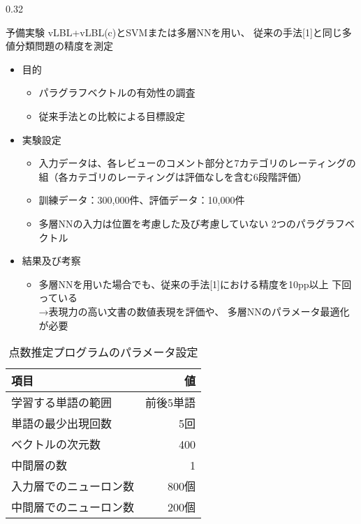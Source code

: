\documentclass[10pt,unicode]{beamer}
\newcommand{\columnsize}{0.32}
\newcommand{\tablefontsize}{\small}
\newcommand{\itemtitle}[1]{{\normalsize #1} \\}
\newcommand{\arrow}{{\color{ttiblue} →}\hspace{1ex}}
\begin{document}
\begin{frame}{}
\begin{columns}[t]
\begin{column}{\columnsize\textwidth} %
  \begin{block}{予備実験}
    vLBL+vLBL(c)とSVMまたは多層NNを用い、
    従来の手法[1]と同じ多値分類問題の精度を測定

    \begin{itemize}
      \item \itemtitle{目的}
      \begin{itemize}
        \item パラグラフベクトルの有効性の調査
        \item 従来手法との比較による目標設定
      \end{itemize}

      \item \itemtitle{実験設定}
      \begin{itemize}
        \item 入力データは、各レビューのコメント部分と7カテゴリのレーティングの
        組（各カテゴリのレーティングは評価なしを含む6段階評価）
        \item 訓練データ：300,000件、評価データ：10,000件
        \item 多層NNの入力は位置を考慮した及び考慮していない
        2つのパラグラフベクトル
      \end{itemize}

      \item \itemtitle{結果及び考察}
      \begin{itemize}
        \item 多層NNを用いた場合でも、従来の手法[1]における精度を10pp以上
          下回っている \\
          \arrow 表現力の高い文書の数値表現を評価や、
          多層NNのパラメータ最適化が必要
      \end{itemize}
    \end{itemize}

    \begin{table}
    \tablefontsize
    \caption{点数推定プログラムのパラメータ設定}
    \label{table:parameters}
    \begin{tabular}{l | r}
    項目 & 値 \\
    \hline
    学習する単語の範囲 & 前後5単語 \\
    単語の最少出現回数 & 5回 \\
    ベクトルの次元数 & 400 \\
    中間層の数 & 1 \\
    入力層でのニューロン数 & 800個 \\
    中間層でのニューロン数 & 200個
    \end{tabular}
    \end{table}


\end{block}
\end{column}
\end{columns}
\end{frame}
\end{document}
